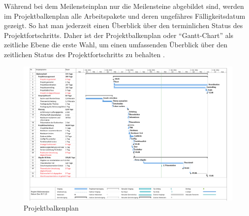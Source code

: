 Während bei dem Meilensteinplan nur die Meilensteine abgebildet sind, werden im Projektbalkenplan alle Arbeitspakete und deren ungefähres Fälligkeitsdatum gezeigt. So hat man jederzeit einen Überblick über den terminlichen Status des Projektfortschritts. Daher ist der Projektbalkenplan oder \enquote{Gantt-Chart}  als zeitliche Ebene die erste Wahl, um einen umfassenden Überblick über den zeitlichen Status des Projektfortschritts zu behalten \cite{domendos:2019}.

\begin{landscape}
	\begin{figure}[H]
		\centering
		\includegraphics[width=1\linewidth]{Bilder/ganttchart}
		\caption{Projektbalkenplan}
		\label{fig:projektbalkenplan}
	\end{figure}
\end{landscape}